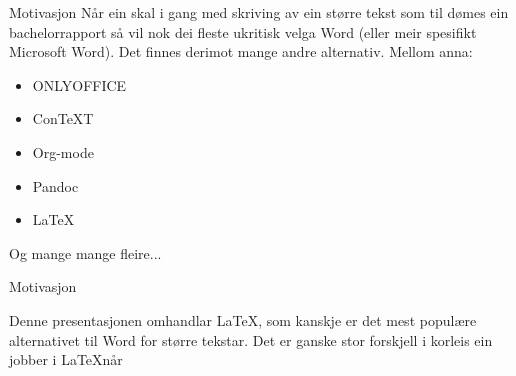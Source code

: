 
\begin{frame}{Motivasjon}
Når ein skal i gang med skriving av ein større tekst som til dømes ein bachelorrapport så vil nok dei fleste ukritisk velga Word (eller meir spesifikt Microsoft Word). Det finnes derimot mange andre alternativ. Mellom anna:

\begin{itemize}
	\item ONLYOFFICE
	\item ConTeXT
	\item Org-mode
	\item Pandoc
	\item \LaTeX
\end{itemize}

Og mange mange fleire...

\end{frame}


\begin{frame}{Motivasjon}

Denne presentasjonen omhandlar \LaTeX, som kanskje er det mest populære alternativet til Word for større tekstar. Det er ganske stor forskjell i korleis ein jobber i \LaTeX når 
	
\end{frame}
